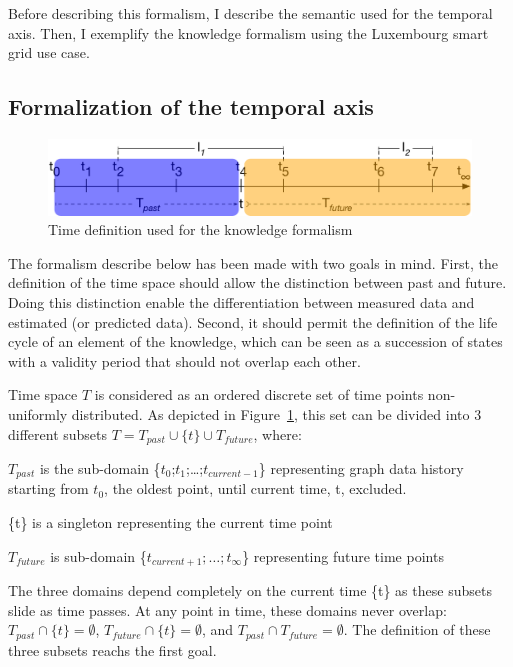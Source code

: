 Before describing this formalism, I describe the semantic used for the temporal axis.
Then, I exemplify the knowledge formalism using the Luxembourg smart grid use case.

\subsection{Formalization of the temporal axis}
\label{sec:tkm:timeDef}

\begin{figure}
   \centering
	\includegraphics[width=\textwidth]{img/chapt-tkm/formalismeTime}
	\caption{Time definition used for the knowledge formalism}
	\label{fig:tkm:formalismeTime}
\end{figure}

The formalism describe below has been made with two goals in mind.
First, the definition of the time space should allow the distinction between past and future. 
Doing this distinction enable the differentiation between measured data and estimated (or predicted data).
Second, it should permit the definition of the life cycle of an element of the \gls{knowledge}, which can be seen as a succession of states with a validity period that should not overlap each other.

Time space $T$ is considered as an ordered discrete set of time points non-uniformly distributed. 
As depicted in Figure~\ref{fig:tkm:formalismeTime}, this set can be divided into 3 different subsets $T = T_{past} \cup \{t\} \cup T_{future}$, where:  
\begin{condItemize}
	\item $T_{past}$ is the sub-domain \{$t_{0}$;$t_{1}$;\ldots;$t_{current-1}$\}  representing graph data history starting from $t_0$, the oldest point, until current time, t, excluded.
	\item \{t\} is a singleton representing the current time 
point
	\item $T_{future}$ is sub-domain \{$t_{current+1};\ldots;t_{\infty}$\} representing future time points 
\end{condItemize}
The three domains depend completely on the current time \{t\} as these subsets slide as time passes. 
At any point in time, these domains never overlap: $T_{past} \cap \{t\} = \emptyset$, $T_{future} \cap \{t\} =  \emptyset$, and $T_{past} \cap T_{future} = \emptyset$.
The definition of these three subsets reachs the first goal.

